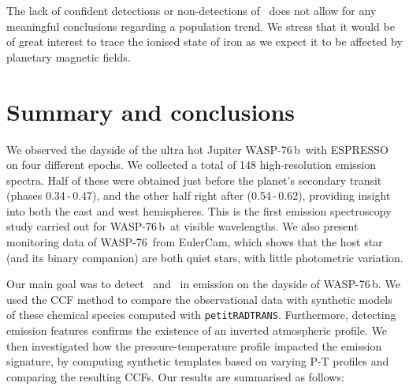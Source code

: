 \documentclass{aa}
\newcommand{\feI}{\ion{Fe}{i}}
\newcommand{\feII}{\ion{Fe}{ii}}
\newcommand{\planet}{WASP-76\,b}
\newcommand{\hoststar}{WASP-76}
\begin{document}
The lack of confident detections or non-detections of \feII\ does not allow for any meaningful conclusions regarding a population trend. We stress that it would be of great interest to trace the ionised state of iron as we expect it to be affected by planetary magnetic fields.




\section{Summary and conclusions} \label{summary}

We observed the dayside of the ultra hot Jupiter \planet\ with ESPRESSO on four different epochs. We collected a total of 148 high-resolution emission spectra. Half of these were obtained just before the planet's secondary transit (phases 0.34\,-\,0.47), and the other half right after (0.54\,-\,0.62), providing insight into both the east and west hemispheres. This is the first emission spectroscopy study carried out for \planet\ at visible wavelengths. We also present monitoring data of \hoststar\ from EulerCam, which shows that the host star (and its binary companion) are both quiet stars, with little photometric variation.

Our main goal was to detect \feI\ and \feII\ in emission on the dayside of \planet. We used the CCF method to compare the observational data with synthetic models of these chemical species computed with \texttt{petitRADTRANS}. Furthermore, detecting emission features confirms the existence of an inverted atmospheric profile. We then investigated how the pressure-temperature profile impacted the emission signature, by computing synthetic templates based on varying P-T profiles and comparing the resulting CCFs. Our results are summarised as follows:
\end{document}
